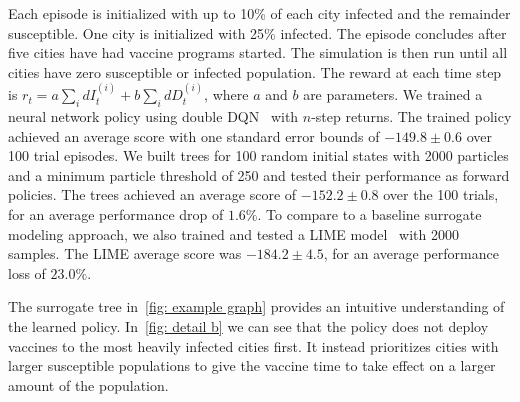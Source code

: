 \documentclass[letterpaper]{article} %
\begin{document}
Each episode is initialized with up to 10\% of each city infected and the remainder susceptible.
One city is initialized with 25\% infected.
The episode concludes after five cities have had vaccine programs started.
The simulation is then run until all cities have zero susceptible or infected population.
The reward at each time step is $ r_t = a \sum_i dI^{(i)}_t + b \sum_i dD^{(i)}_t $, where $a$ and $b$ are parameters.  We trained a neural network policy using double DQN~\cite{hasselt2010} with $n$-step returns.
The trained policy achieved an average score with one standard error bounds of $-149.8 \pm 0.6$ over 100 trial episodes.
We built trees for 100 random initial states with 2000 particles and a minimum particle threshold of 250 and tested their performance as forward policies.
The trees achieved an average score of $-152.2 \pm 0.8$ over the 100 trials, for an average performance drop of $1.6 \%$.
To compare to a baseline surrogate modeling approach, we also trained and tested a LIME model~\cite{ribeiro2016} with 2000 samples.
The LIME average score was $-184.2 \pm 4.5$, for an average performance loss of $23.0 \%$.

The surrogate tree in~\cref{fig: example graph} provides an intuitive understanding of the learned policy.
In~\cref{fig: detail b} we can see that the policy does not deploy vaccines to the most heavily infected cities first.
It instead prioritizes cities with larger susceptible populations to give the vaccine time to take effect on a larger amount of the population.
\end{document}
